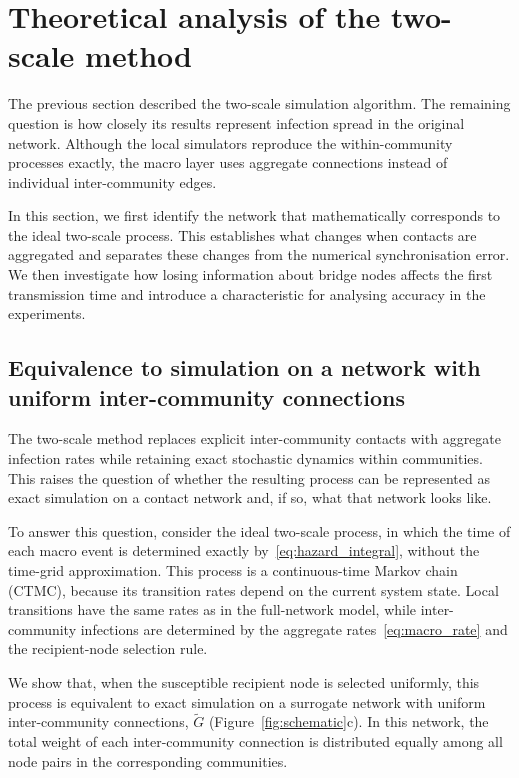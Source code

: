 \documentclass[a4paper,fleqn]{cas-sc}
\begin{document}
\section{Theoretical analysis of the two-scale method}
\label{sec:analysis}

The previous section described the two-scale simulation algorithm. The remaining question is how closely its results represent infection spread in the original network. Although the local simulators reproduce the within-community processes exactly, the macro layer uses aggregate connections instead of individual inter-community edges.

In this section, we first identify the network that mathematically corresponds to the ideal two-scale process. This establishes what changes when contacts are aggregated and separates these changes from the numerical synchronisation error. We then investigate how losing information about bridge nodes affects the first transmission time and introduce a characteristic for analysing accuracy in the experiments.

\subsection{Equivalence to simulation on a network with uniform inter-community connections}
\label{sec:surrogate}

The two-scale method replaces explicit inter-community contacts with aggregate infection rates while retaining exact stochastic dynamics within communities. This raises the question of whether the resulting process can be represented as exact simulation on a contact network and, if so, what that network looks like.

To answer this question, consider the ideal two-scale process, in which the time of each macro event is determined exactly by~\eqref{eq:hazard_integral}, without the time-grid approximation. This process is a continuous-time Markov chain (CTMC), because its transition rates depend on the current system state. Local transitions have the same rates as in the full-network model, while inter-community infections are determined by the aggregate rates~\eqref{eq:macro_rate} and the recipient-node selection rule.

We show that, when the susceptible recipient node is selected uniformly, this process is equivalent to exact simulation on a surrogate network with uniform inter-community connections, $\tilde G$ (Figure~\ref{fig:schematic}c). In this network, the total weight of each inter-community connection is distributed equally among all node pairs in the corresponding communities.
\end{document}
